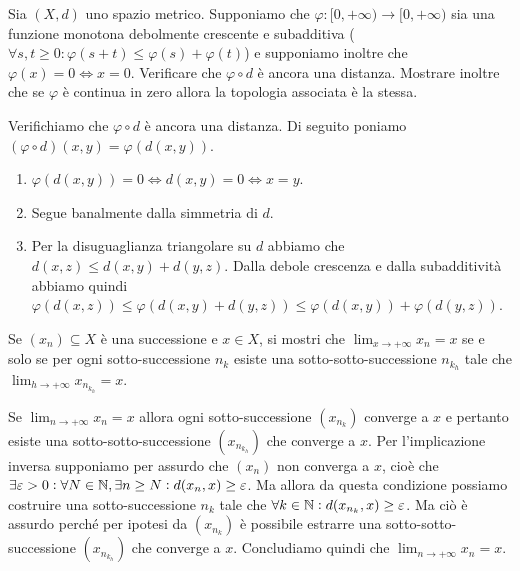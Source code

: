 \begin{es}
  Sia $ (X, d) $ uno spazio metrico. Supponiamo che $ \varphi \colon [0, +\infty) \to [0, +\infty) $ sia una funzione monotona debolmente crescente e subadditiva ($ \forall s, t \geq 0 : \varphi(s + t) \leq \varphi(s) + \varphi(t) $) e supponiamo inoltre che $ \varphi(x) = 0 \iff x = 0 $. Verificare che $ \varphi \circ d $ è ancora una distanza. Mostrare inoltre che se $ \varphi $ è continua in zero allora la topologia associata è la stessa.
\end{es}
%
Verifichiamo che $ \varphi \circ d $ è ancora una distanza. Di seguito poniamo $ (\varphi \circ d)(x, y) = \varphi\left(d(x, y)\right) $.
\begin{enumerate}[label = (\roman*)]
\item $ \varphi\left(d(x, y)\right) = 0 \iff d(x, y) = 0 \iff x = y $.
\item Segue banalmente dalla simmetria di $ d $.
\item Per la disuguaglianza triangolare su $ d $ abbiamo che $ d(x, z) \leq d(x, y) + d(y, z) $. Dalla debole crescenza e dalla subadditività abbiamo quindi $ \varphi\left(d(x, z)\right) \leq \varphi\left(d(x, y) + d(y, z)\right) \leq \varphi\left(d(x, y)\right) + \varphi\left(d(y, z)\right) $.
\end{enumerate}

\begin{es}
  Se $ (x_n) \subseteq X $ è una successione e $ x \in X $, si mostri che $ \lim_{x \to +\infty} x_n = x $ se e solo se per ogni sotto-successione $ n_k $ esiste una sotto-sotto-successione $ n_{k_h} $ tale che $ \lim_{h \to +\infty} x_{n_{k_h}} = x $.
\end{es}
%
Se $ \lim_{n \to +\infty} x_n = x $ allora ogni sotto-successione $ (x_{n_k}) $ converge a $ x $ e pertanto esiste una sotto-sotto-successione $ (x_{n_{k_h}}) $ che converge a $ x $. Per l'implicazione inversa supponiamo per assurdo che $ (x_n) $ non converga a $ x $, cioè che $ \exists \varepsilon > 0 : \forall N \in \mathbb{N}, \exists n \geq N : d(x_n, x) \geq \varepsilon $. Ma allora da questa condizione possiamo costruire una sotto-successione $ n_k $ tale che $ \forall k \in \mathbb{N} : d(x_{n_k}, x) \geq \varepsilon $. Ma ciò è assurdo perché per ipotesi da $ (x_{n_k}) $ è possibile estrarre una sotto-sotto-successione $ (x_{n_{k_h}}) $ che converge a $ x $. Concludiamo quindi che $ \lim_{n \to +\infty} x_n = x $.


